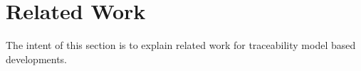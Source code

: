 \section{Related Work}

The intent of this section is to explain related work for traceability model based developments.
